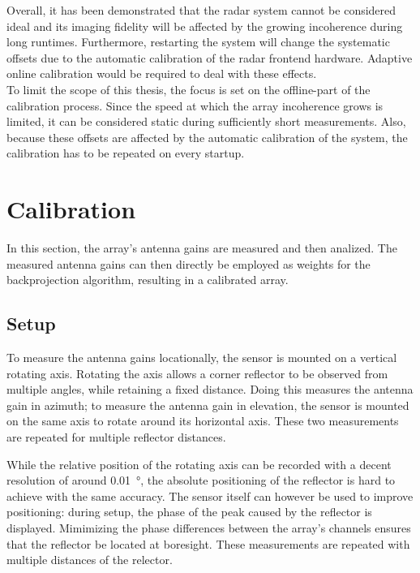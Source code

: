 Overall, it has been demonstrated that the radar system cannot be considered ideal and
its imaging fidelity will be affected by the growing incoherence during long runtimes.
Furthermore, restarting the system will change the systematic offsets due to the automatic calibration of the radar frontend hardware.
Adaptive online calibration would be required to deal with these effects. \\

To limit the scope of this thesis, the focus is set on the offline-part of the calibration process.
Since the speed at which the array incoherence grows is limited, it can be considered static during sufficiently short measurements.
Also, because these offsets are affected by the automatic calibration of the system, the calibration has to be repeated on every startup.

\section{Calibration}
\label{sec:calibration}

In this section, the array's antenna gains are measured and then analized.
The measured antenna gains can then directly be employed as weights for the backprojection algorithm,
resulting in a calibrated array.

\subsection{Setup}
To measure the antenna gains locationally, the sensor is mounted on a vertical rotating axis.
Rotating the axis allows a corner reflector to be observed from multiple angles, while retaining a fixed distance.
Doing this measures the antenna gain in azimuth;
to measure the antenna gain in elevation, the sensor is mounted on the same axis to rotate around its horizontal axis.
These two measurements are repeated for multiple reflector distances.

While the relative position of the rotating axis can be recorded with a decent resolution of around \SI{0.01}{\degree},
the absolute positioning of the reflector is hard to achieve with the same accuracy.
The sensor itself can however be used to improve positioning:
during setup, the phase of the peak caused by the reflector is displayed.
Mimimizing the phase differences between the array's channels ensures that the reflector be located at boresight.
These measurements are repeated with multiple distances of the relector.\\


